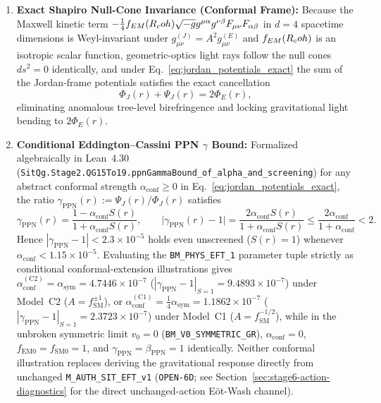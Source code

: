 \begin{enumerate}[leftmargin=2em]
  \item \textbf{Exact Shapiro Null-Cone Invariance (Conformal Frame):} Because the Maxwell kinetic term $-\frac{1}{4}f_{EM}(R_coh)\sqrt{-g}g^{\mu\alpha}g^{\nu\beta}F_{\mu\nu}F_{\alpha\beta}$ in $d=4$ spacetime dimensions is Weyl-invariant under $g_{\mu\nu}^{(J)} = A^2 g_{\mu\nu}^{(E)}$ and $f_{EM}(R_coh)$ is an isotropic scalar function, geometric-optics light rays follow the null cones $ds^2 = 0$ identically, and under Eq.~\eqref{eq:jordan_potentials_exact} the sum of the Jordan-frame potentials satisfies the exact cancellation
  \begin{equation}
  \Phi_J(r) + \Psi_J(r) = 2\Phi_E(r),
  \label{eq:shapiro_null_cone_invariance}
  \end{equation}
  eliminating anomalous tree-level birefringence and locking gravitational light bending to $2\Phi_E(r)$.
  \item \textbf{Conditional Eddington--Cassini PPN $\gamma$ Bound:} Formalized algebraically in Lean~4.30 (\texttt{SitQg.Stage2.QG15To19.ppnGammaBound\_of\_alpha\_and\_screening}) for any abstract conformal strength $\alpha_{\mathrm{conf}} \ge 0$ in Eq.~\eqref{eq:jordan_potentials_exact}, the ratio $\gamma_{\mathrm{PPN}}(r) := \Psi_J(r)/\Phi_J(r)$ satisfies
  \begin{equation}
  \gamma_{\mathrm{PPN}}(r) = \frac{1 - \alpha_{\mathrm{conf}} S(r)}{1 + \alpha_{\mathrm{conf}} S(r)},
  \qquad
  \bigl|\gamma_{\mathrm{PPN}}(r) - 1\bigr|
  = \frac{2\alpha_{\mathrm{conf}} S(r)}{1 + \alpha_{\mathrm{conf}} S(r)}
  \le \frac{2\alpha_{\mathrm{conf}}}{1 + \alpha_{\mathrm{conf}}} < 2.
  \label{eq:gamma_ppn_exact_bound}
  \end{equation}
  Hence $|\gamma_{\mathrm{PPN}} - 1| < 2.3 \times 10^{-5}$ holds even unscreened ($S(r) = 1$) whenever $\alpha_{\mathrm{conf}} < 1.15 \times 10^{-5}$. Evaluating the \texttt{BM\_PHYS\_EFT\_1} parameter tuple strictly as conditional conformal-extension illustrations gives $\alpha_{\mathrm{conf}}^{(\mathrm{C2})} = \alpha_{\mathrm{sym}} = 4.7446\times 10^{-7}$ ($|\gamma_{\mathrm{PPN}}-1|_{S=1} = 9.4893\times 10^{-7}$) under Model~C2 ($A = f_{\mathrm{SM}}^{\pm 1}$), or $\alpha_{\mathrm{conf}}^{(\mathrm{C1})} = \frac{1}{4}\alpha_{\mathrm{sym}} = 1.1862\times 10^{-7}$ ($|\gamma_{\mathrm{PPN}}-1|_{S=1} = 2.3723\times 10^{-7}$) under Model~C1 ($A = f_{\mathrm{SM}}^{-1/2}$), while in the unbroken symmetric limit $v_0 = 0$ (\texttt{BM\_V0\_SYMMETRIC\_GR}), $\alpha_{\mathrm{conf}} = 0$, $f_{\mathrm{EM}0} = f_{\mathrm{SM}0} = 1$, and $\gamma_{\mathrm{PPN}} = \beta_{\mathrm{PPN}} = 1$ identically. Neither conformal illustration replaces deriving the gravitational response directly from unchanged \texttt{M\_AUTH\_SIT\_EFT\_v1} (\texttt{OPEN-6D}; see Section~\ref{sec:stage6-action-diagnostics} for the direct unchanged-action E\"ot-Wash channel).
\end{enumerate}


